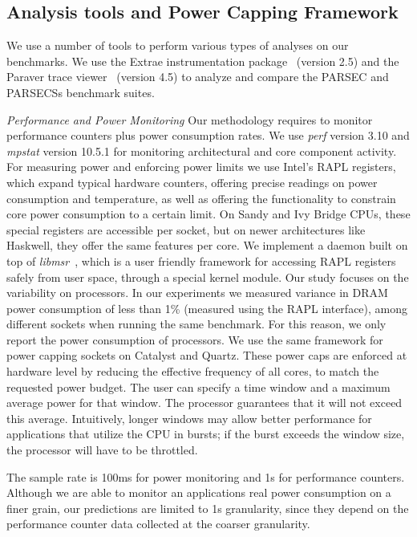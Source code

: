 \subsection{Analysis tools and Power Capping Framework}
We use a number of tools to perform various types of analyses on our benchmarks.  We use
the Extrae instrumentation package~\cite{Labarta2006} (version 2.5) and the Paraver trace
viewer~\cite{Labarta2006} (version 4.5) to analyze and compare the PARSEC and PARSECSs
benchmark suites.
 

\textit{Performance and Power Monitoring} 
Our methodology requires to monitor performance counters plus power consumption rates.  We
use \textit{perf} version 3.10 and \textit{mpstat} version 10.5.1 for monitoring
architectural and core component activity.  For measuring power and enforcing power limits
we use Intel's RAPL registers, which expand typical hardware counters, offering precise
readings on power consumption and temperature, as well as offering the functionality to
constrain core power consumption to a certain limit.  On Sandy and Ivy Bridge CPUs, these
special registers are accessible per socket, but on newer architectures like Haskwell,
they offer the same features per core.  We implement a daemon built on top of
\textit{libmsr}~\cite{libmsr}, which is a user friendly framework for accessing RAPL
registers safely from user space, through a special kernel module.  Our study focuses on
the variability on processors.  In our experiments we measured variance in DRAM power
consumption of less than 1\% (measured using the RAPL interface), among different
sockets when running the same benchmark.  For this reason, we only report the power 
consumption of processors.  We use the same framework for power capping sockets on
Catalyst and Quartz.  These power caps are enforced at hardware level by reducing the 
effective frequency of all cores, to match the requested power budget.
The user can specify a time window and a maximum average power for that window.
The processor guarantees that it will not exceed this average.
Intuitively, longer windows may allow better performance
for applications that utilize the CPU in bursts; if the burst
exceeds the window size, the processor will have to be
throttled.

The sample rate is 100ms for power monitoring and 1s for performance counters.  Although
we are able to monitor an applications real power consumption on a finer grain, our
predictions are limited to 1s granularity, since they depend on the performance counter
data collected at the coarser granularity.

